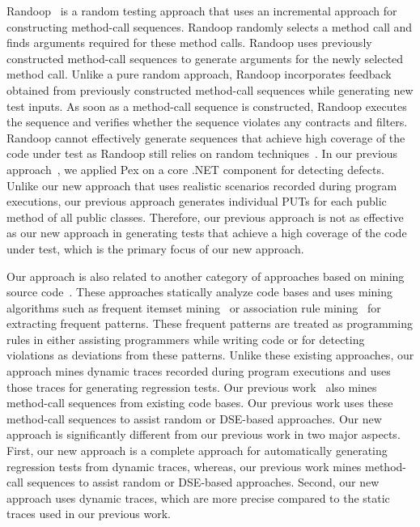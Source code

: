 Randoop~\cite{pacheco:feedback} is a random testing approach that uses an incremental approach for constructing method-call sequences. Randoop randomly selects a method call and finds arguments required for these method calls. Randoop uses previously constructed method-call sequences to generate arguments for the newly selected method call. Unlike a pure random approach, Randoop incorporates feedback obtained from previously constructed method-call sequences while generating new test inputs. As soon as a method-call sequence is constructed, Randoop executes the sequence and verifies whether the sequence violates any contracts and filters. Randoop cannot effectively generate sequences that achieve high coverage of the code under test as Randoop still relies on random techniques~\cite{thummalapenta09:mseqgen}. In our previous approach~\cite{tillman:pexwhite}, we applied Pex on a core .NET component for detecting defects. Unlike our new approach that uses realistic scenarios recorded during program executions, our previous approach generates individual PUTs for each public method of all public classes. Therefore, our previous approach is not as effective as our new approach in generating tests that achieve a high coverage of the code under test, which is the primary focus of our new approach.

Our approach is also related to another category of approaches based on mining source code~\cite{Engler2001deviant, acharya06:mining, wasylkowski07:detecting, thummalapenta09:mseqgen}. These approaches statically analyze code bases and uses mining algorithms such as 
frequent itemset mining~\cite{wang:bide} or association rule mining~\cite{agarwal:association} for extracting frequent patterns. These frequent patterns are treated as programming rules in either assisting programmers while writing code or for detecting violations as deviations from these patterns. Unlike these existing approaches, our approach mines dynamic traces recorded during program executions and uses those traces for generating regression tests. Our previous work~\cite{thummalapenta09:mseqgen} also mines method-call sequences from existing code bases. Our previous work uses these method-call sequences to assist random or DSE-based approaches. Our new approach is significantly different from our previous work in two major aspects. First, our new approach is a complete approach for automatically generating regression tests from dynamic traces, whereas, our previous work mines method-call sequences to assist random or DSE-based approaches. Second, our new approach uses dynamic traces, which are more precise compared to the static traces used in our previous work.